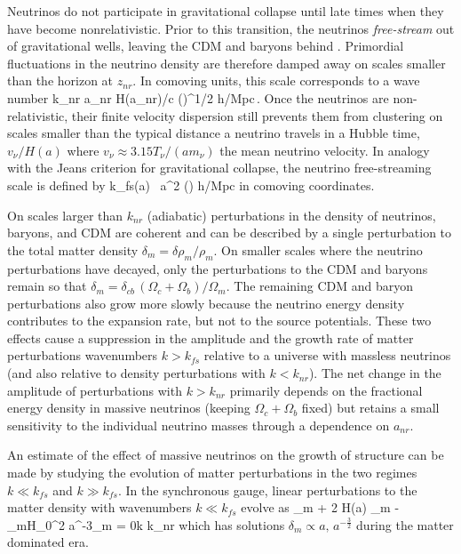 Neutrinos do not participate in gravitational collapse until late times when they have become nonrelativistic. Prior to this transition, the neutrinos {\em free-stream} out of gravitational wells, leaving the CDM and baryons behind  \cite{Bond:1983hb, Ma:1996za, Hu:1997vi, Hu:1997mj}. Primordial fluctuations in the neutrino density are therefore damped away on scales smaller than the horizon at $z_{nr}$. In comoving units, this scale corresponds to a wave number
\beq
k_{nr} \equiv a_{nr} H(a_{nr})/c  \left(\right)^{1/2} h/{\rm Mpc}\,.
\eeq
Once the neutrinos are non-relativistic, their finite velocity dispersion still prevents them from clustering on scales smaller than the typical distance a neutrino travels in a Hubble time, $v_\nu /H(a)$ where $v_\nu \approx 3.15 T_\nu/(a m_\nu)$ the mean neutrino velocity. In analogy with the Jeans criterion for gravitational collapse, the neutrino free-streaming scale is defined by \cite{Bond:1983hb, Lesgourgues:2006nd}
\beq
k_{fs}(a) \equiv {} \, a^2 \left(\right) h/{\rm Mpc}
\eeq
in comoving coordinates. 

On scales larger than $k_{nr}$ (adiabatic) perturbations in the density of neutrinos, baryons, and CDM are coherent and can be described by a single perturbation to the total matter density $\delta_m= \delta \rho_m/\rho_m$. On smaller scales where the neutrino perturbations have decayed, only the perturbations to the CDM and baryons remain so that $\delta_{m} = \delta_{cb}\, (\Omega_{c} + \Omega_b)/\Omega_m $. The remaining CDM and baryon perturbations also grow more slowly because the neutrino energy density contributes to the expansion rate, but not to the source potentials. These two effects cause a suppression in the amplitude and the growth rate of matter perturbations wavenumbers $k > k_{fs}$ relative to a universe with massless neutrinos (and also relative to density perturbations with $k<k_{nr}$). The net change in the amplitude of perturbations with $k > k_{nr}$ primarily depends on the fractional energy density in massive neutrinos (keeping $\Omega_c+\Omega_b$ fixed) but retains a small sensitivity to the individual neutrino masses through a dependence on $a_{nr}$. 

An estimate of the effect of massive neutrinos on the growth of structure can be made by studying the evolution of matter perturbations in the two regimes $k\ll k_{fs}$ and $k\gg k_{fs}$.  In the synchronous gauge, linear perturbations to the matter density with wavenumbers $k \ll k_{fs}$ evolve as
\beq
\label{eq:ddotdeltalarge}
\ddot{\delta}_m + 2 H(a) \dot\delta_m - \Omega_mH_0^2 a^{-3}\delta_m = 0\quad k \ll k_{nr}
\eeq
which has solutions $\delta_m \propto a, \, a^{-\frac{3}{2}}$ during the matter dominated era. %

